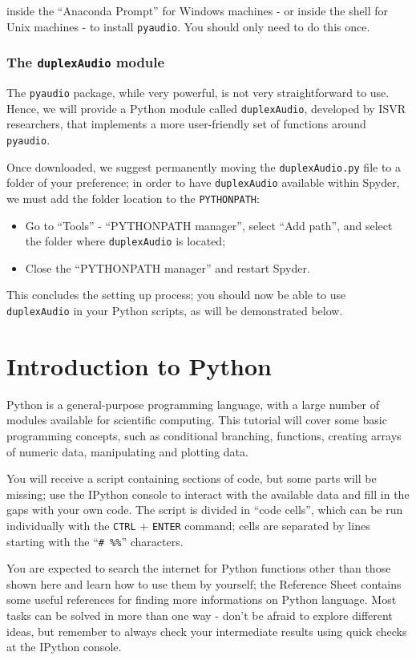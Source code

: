inside the ``Anaconda Prompt'' for Windows machines - or inside the shell for Unix machines - to install {\tt pyaudio}. You should only need to do this once.

\subsubsection{The {\tt duplexAudio} module}

The {\tt pyaudio} package, while very powerful, is not very straightforward to use. Hence, we will provide a Python module called {\tt duplexAudio}, developed by ISVR researchers, that implements a more user-friendly set of functions around {\tt pyaudio}.

Once downloaded, we suggest permanently moving the {\tt duplexAudio.py} file to a folder of your preference; in order to have {\tt duplexAudio} available within Spyder, we must add the folder location to the {\tt PYTHONPATH}:

\begin{itemize}
	\item Go to ``Tools'' - ``PYTHONPATH manager'', select ``Add path'', and select the folder where {\tt duplexAudio} is located;
	\item Close the ``PYTHONPATH manager'' and restart Spyder.
\end{itemize}

This concludes the setting up process; you should now be able to use {\tt duplexAudio} in your Python scripts, as will be demonstrated below.

\section{Introduction to Python}

Python is a general-purpose programming language, with a large number of modules available for scientific computing. This tutorial will cover some basic programming concepts, such as conditional branching, functions, creating arrays of numeric data, manipulating and plotting data.

You will receive a script containing sections of code, but some parts will be missing; use the IPython console to interact with the available data and fill in the gaps with your own code. The script is divided in ``code cells'', which can be run individually with the {\tt CTRL} + {\tt ENTER} command; cells are separated by lines starting with the ``{\tt \# \%\%}'' characters.

You are expected to search the internet for Python functions other than those shown here and learn how to use them by yourself; the Reference Sheet contains some useful references for finding more informations on Python language. Most tasks can be solved in more than one way - don't be afraid to explore different ideas, but remember to always check your intermediate results using quick checks at the IPython console.

